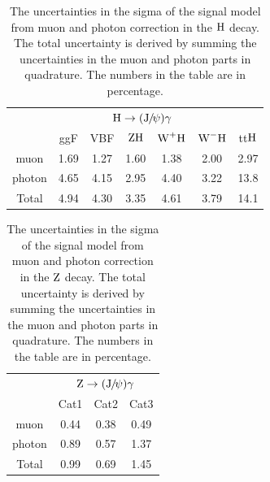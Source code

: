 	\begin{table}[!ht]
	\small
	    \begin{center}
	    \caption{The uncertainties in the sigma of the signal model from muon and photon correction in the $\mathrm{H}$ decay. The total uncertainty is derived by summing the uncertainties in the muon and photon parts in quadrature. The numbers in the table are in percentage.}
	    \begin{tabular}{ccccccc}
	    \hline
	    & \multicolumn{5}{c}{$\mathrm{H}\to ({\mathrm{J}\hspace{-.08em}/\hspace{-.14em}\psi})\gamma$} \\
	    & ggF & VBF & $\mathrm{Z}\mathrm{H}$ & $\text{W}^{+}\mathrm{H}$ & $\text{W}^{-}\mathrm{H}$ & tt$\mathrm{H}$ \\
	      \cline{2-7}
	      muon &  1.69 & 1.27 & 1.60 & 1.38 & 2.00 & 2.97\\
	      photon & 4.65 & 4.15 & 2.95 & 4.40 & 3.22 & 13.8\\
	      Total & 4.94 & 4.30 & 3.35 & 4.61 & 3.79 & 14.1\\
	      \hline
	    \end{tabular}
	    \label{tab:HJpsiGUnSigma}
	    \end{center}
	\end{table}
	
	\begin{table}[!ht]
	\small
	    \begin{center}
	    \caption{The uncertainties in the sigma of the signal model from muon and photon correction in the $\mathrm{Z}$ decay. The total uncertainty is derived by summing the uncertainties in the muon and photon parts in quadrature. The numbers in the table are in percentage.}
	    \begin{tabular}{cccc}
	    \hline
	    & \multicolumn{3}{c}{$\mathrm{Z}\to ({\mathrm{J}\hspace{-.08em}/\hspace{-.14em}\psi})\gamma$} \\
	    & Cat1 & Cat2 & Cat3 \\
	      \cline{2-4}
	      muon  & 0.44 & 0.38 & 0.49 \\
	      photon & 0.89 & 0.57 & 1.37 \\
	      Total & 0.99 & 0.69 & 1.45 \\
	      \hline
	    \end{tabular}
	    \label{tab:ZJpsiGUnSigma}
	    \end{center}
	\end{table}